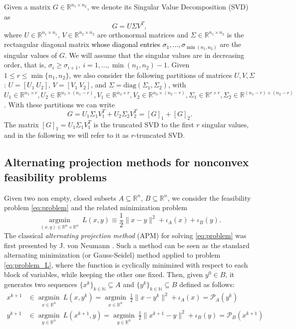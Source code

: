 \documentclass[pdflatex,sn-mathphys-num]{sn-jnl}
\numberwithin{equation}{section}%
\def\R{\mathbb{R}}
\def\N{\mathbb{N}}
\newcommand{\proj}{\mathcal{P}}
\def\diag{\text{diag}}
\newcommand{\Tsvd}[1]{[ #1 ]_1}
\newcommand{\tsvd}[1]{[ #1 ]_2}
\newcommand{\ste}[1]{\textcolor{black}{#1}}
\theoremstyle{thmstyleone}%
\theoremstyle{thmstyletwo}%
\theoremstyle{thmstylethree}%
\begin{document}
Given a matrix $G \in \R^{n_1 \times n_2}$,  we denote its  Singular Value Decomposition (SVD) as
\[
G = U \Sigma V^T,
\]
where $U\in \R^{n_1 \times n_1}$, $V\in \R^{n_2 \times n_2}$ are orthonormal matrices and $\Sigma \in \R^{n_1 \times n_2}$ is the rectangular diagonal matrix \ste{whose diagonal entries $\sigma_1, \dots, \sigma_{\min(n_1,n_2)}$} are the singular values of $G$.
We will assume that the singular values are in decreasing order, that is, $\sigma_i \ge \sigma_{i+1}, \ i=1,\dots,\min(n_1,n_2)-1$. 
Given $1 \le r \le \min \{ n_1, n_2 \}$, we also consider the following partitions of matrices $U, V, \Sigma$: $U = [U_1 \ U_2]$, $V = [V_1 \ V_2]$, and $\Sigma = \diag(\Sigma_1, \Sigma_2)$, with $U_1 \in \R^{n_1 \times r}, U_2 \in \R^{n_1 \times (n_1-r)}, V_1 \in \R^{n_2 \times r}, V_2 \in \R^{n_2 \times (n_2-r)}, \Sigma_1 \in \R^{r \times r}, \Sigma_2 \in \R^{(n_1-r) \times (n_2-r)}$. With these partitions we can write
\begin{equation} \label{eq:svd_part}
    G = U_1 \Sigma_1 V_1^T + U_2 \Sigma_2 V_2^T = \Tsvd{G} + \tsvd{G}.
\end{equation}
The matrix $\Tsvd{G} = U_1 \Sigma_1 V_1^T$ is the {truncated SVD} to the first $r$ singular values, and in the following we will refer to it as $r$-truncated SVD. 

\subsection{Alternating projection methods for nonconvex feasibility problems}
Given two non empty, closed subsets $A\subseteq \R^n$, $B\subseteq \R^n$, we consider the feasibility problem \eqref{eq:problem} and the related minimization problem
\begin{equation}\label{eq:problem_L}
    \underset{(x,y)\in\R^n\times \R^n}{\operatorname{argmin}} \ L(x,y) \equiv \frac{1}{2}\|x-y\|^2+\iota_A(x)+\iota_B(y).
\end{equation}
The classical {\it alternating projection method} (APM) for solving \eqref{eq:problem} was first presented by J. von Neumann \cite{Neumann-etal-1950}. Such a method can be seen as the standard alternating minimization (or Gauss-Seidel) method applied to problem \eqref{eq:problem_L}, where the function is cyclically minimized with respect to each block of variables, while keeping the other one fixed. Then, given $y^0\in B$, it generates two sequences $\{x^k\}_{k\in\N}\subseteq A$ and $\{y^k\}_{k\in\N}\subseteq B$ defined as follows:
\begin{align} 
    x^{k+1}&\in \underset{x\in\R^n}{\operatorname{argmin}} \ L(x,y^k)=\underset{x\in\R^n}{\operatorname{argmin}} \ \frac{1}{2}\|x-y^k\|^2+\iota_A(x)=\proj_A(y^k)\label{APM1}\\
    y^{k+1}&\in \underset{y\in\R^n}{\operatorname{argmin}} \ L(x^{k+1},y)=\underset{y\in\R^n}{\operatorname{argmin}} \ \frac{1}{2}\|x^{k+1}-y\|^2+\iota_B(y)=\proj_B(x^{k+1}) \label{APM2}
\end{align}
\end{document}
